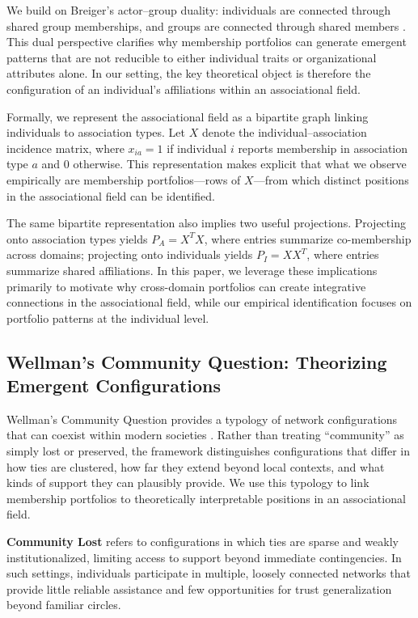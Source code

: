 We build on Breiger's actor--group duality: individuals are connected through shared group memberships, and groups are connected through shared members \parencite{breiger_duality_1974}. This dual perspective clarifies why membership portfolios can generate emergent patterns that are not reducible to either individual traits or organizational attributes alone. In our setting, the key theoretical object is therefore the configuration of an individual's affiliations within an associational field.

Formally, we represent the associational field as a bipartite graph linking individuals to association types. Let $X$ denote the individual--association incidence matrix, where $x_{ia}=1$ if individual $i$ reports membership in association type $a$ and $0$ otherwise. This representation makes explicit that what we observe empirically are membership portfolios---rows of $X$---from which distinct positions in the associational field can be identified.

The same bipartite representation also implies two useful projections. Projecting onto association types yields $P_A = X^{T}X$, where entries summarize co-membership across domains; projecting onto individuals yields $P_I = XX^{T}$, where entries summarize shared affiliations. In this paper, we leverage these implications primarily to motivate why cross-domain portfolios can create integrative connections in the associational field, while our empirical identification focuses on portfolio patterns at the individual level.


\subsection{Wellman's Community Question: Theorizing Emergent Configurations}

Wellman's Community Question provides a typology of network configurations that can coexist within modern societies \parencite{wellman_community_1979}. Rather than treating ``community'' as simply lost or preserved, the framework distinguishes configurations that differ in how ties are clustered, how far they extend beyond local contexts, and what kinds of support they can plausibly provide. We use this typology to link membership portfolios to theoretically interpretable positions in an associational field.

\textbf{Community Lost} refers to configurations in which ties are sparse and weakly institutionalized, limiting access to support beyond immediate contingencies. In such settings, individuals participate in multiple, loosely connected networks that provide little reliable assistance and few opportunities for trust generalization beyond familiar circles.

